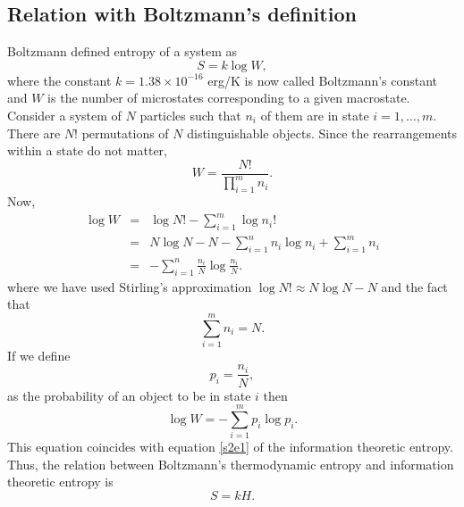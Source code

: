 \documentclass{article}
\numberwithin{equation}{section}
\theoremstyle{plain}
\numberwithin{thm}{section}
\theoremstyle{plain}
\numberwithin{prop}{section}
\theoremstyle{definition}
\numberwithin{defn}{section}
\theoremstyle{remark}
\begin{document}
\subsection{Relation with Boltzmann's definition}
Boltzmann defined entropy of a system as 
\cite[equation (6), chapter 1]{pathria32statistical}
\begin{equation}\label{s2e20}
S = k\log W,
\end{equation}
where the constant $k = 1.38 \times 10^{-16}$ erg/K is now called Boltzmann's
constant and $W$ is the number of microstates corresponding to a given 
macrostate. Consider a system of $N$ particles such that $n_i$ of them are
in state $i = 1, \ldots, m$. There are $N!$ permutations of $N$ distinguishable
objects. Since the rearrangements within a state do not matter,
\begin{equation}\label{s2e21}
W = \frac{N!}{\prod_{i=1}^m n_i}.
\end{equation}
Now,
\begin{eqnarray*}
\log W &=& \log N! - \sum_{i=1}^m \log n_i! \\
 &=& N\log N - N - \sum_{i=1}^n n_i\log n_i + \sum_{i=1}^m n_i \\
 &=& -\sum_{i=1}^n \frac{n_i}{N}\log\frac{n_i}{N}.
\end{eqnarray*}
where we have used Stirling's approximation $\log N! \approx N\log N - N$ and
the fact that
\[
\sum_{i=1}^m n_i = N.
\]
If we define
\begin{equation}\label{s2e22}
p_i = \frac{n_i}{N},
\end{equation}
as the probability of an object to be in state $i$ then
\begin{equation}\label{s2e23}
\log W = -\sum_{i=1}^m p_i \log p_i.
\end{equation}
This equation coincides with equation \eqref{s2e1} of the information theoretic
entropy. Thus, the relation between Boltzmann's thermodynamic entropy and 
information theoretic entropy is
\begin{equation}\label{s2e24}
S = kH.
\end{equation}



\end{document}
